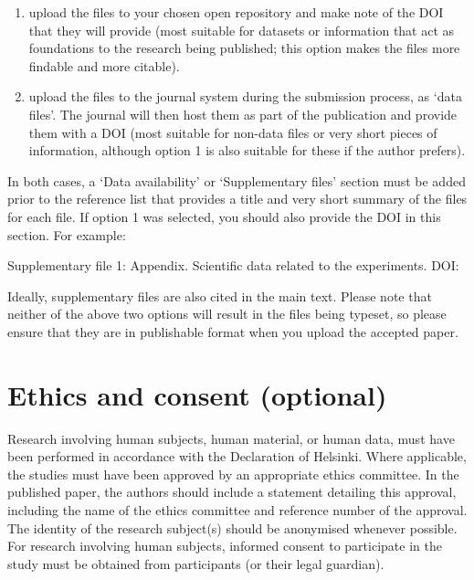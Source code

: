 \documentclass[]{glossa}
\begin{document}
\begin{enumerate}
\def\labelenumi{\arabic{enumi}.}
\item
  upload the files to your chosen open repository and make note of the
  DOI that they will provide (most suitable for datasets or information
  that act as foundations to the research being published; this option
  makes the files more findable and more citable).
\item
  upload the files to the journal system during the submission process,
  as `data files'. The journal will then host them as part of the
  publication and provide them with a DOI (most suitable for non-data
  files or very short pieces of information, although option 1 is also
  suitable for these if the author prefers).
\end{enumerate}

In both cases, a `Data availability' or `Supplementary files' section
must be added prior to the reference list that provides a title and very
short summary of the files for each file. If option 1 was selected, you
should also provide the DOI in this section. For example:

Supplementary file 1: Appendix. Scientific data related to the
experiments. DOI:

Ideally, supplementary files are also cited in the main text. Please
note that neither of the above two options will result in the files
being typeset, so please ensure that they are in publishable format when
you upload the accepted paper.

\hypertarget{ethics-and-consent-optional}{%
\section*{Ethics and consent
(optional)}\label{ethics-and-consent-optional}}

Research involving human subjects, human material, or human data, must
have been performed in accordance with the Declaration of Helsinki.
Where applicable, the studies must have been approved by an appropriate
ethics committee. In the published paper, the authors should include a
statement detailing this approval, including the name of the ethics
committee and reference number of the approval. The identity of the
research subject(s) should be anonymised whenever possible. For research
involving human subjects, informed consent to participate in the study
must be obtained from participants (or their legal guardian).
\end{document}
